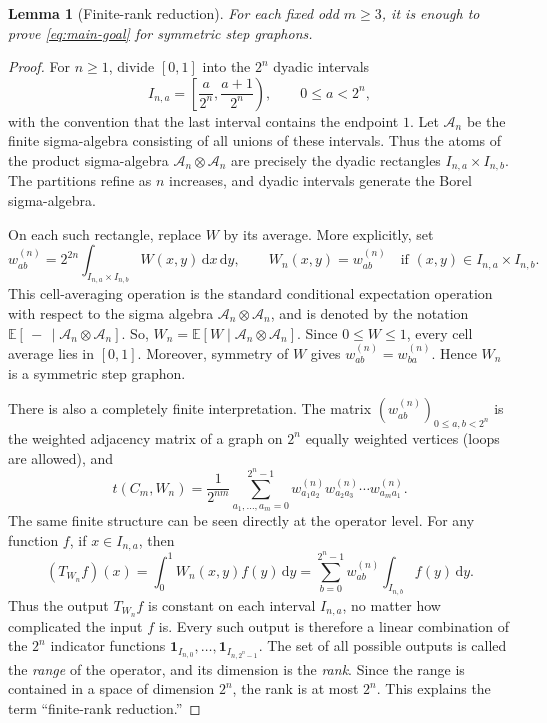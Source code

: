 \documentclass[11pt]{article}
\newtheorem{lemma}[theorem]{Lemma}
\numberwithin{equation}{section}
\newcommand{\one}{\mathbf 1}
\newcommand{\dd}{\,\mathrm d}
\newcommand{\E}{\mathbb E}
\begin{document}
\begin{lemma}[Finite-rank reduction]\label{lem:step-reduction}
  For each fixed odd $m\ge3$, it is enough to prove \eqref{eq:main-goal} for
  symmetric step graphons.
\end{lemma}

\begin{proof}
  For $n\ge1$, divide $[0,1]$ into the $2^n$ dyadic
  intervals
  \[
    I_{n,a}=\left[\frac{a}{2^n},\frac{a+1}{2^n}\right),
    \qquad 0\le a<2^n,
  \]
  with the convention that the last interval contains the endpoint
  $1$.  Let $\mathcal A_n$ be the finite sigma-algebra consisting of all
  unions of these intervals.  Thus the atoms of the product sigma-algebra
  $\mathcal A_n\otimes\mathcal A_n$ are precisely the dyadic rectangles
  $I_{n,a}\times I_{n,b}$.  The partitions refine as $n$ increases, and
  dyadic intervals generate the Borel sigma-algebra.

  On each such rectangle, replace $W$ by its average.  More explicitly, set
  \begin{equation}\label{eq:dyadic-step-approximation}
    w^{(n)}_{ab}
    =2^{2n}\int_{I_{n,a}\times I_{n,b}}W(x,y)\dd x\dd y,
    \qquad
    W_n(x,y)=w^{(n)}_{ab}
    \quad\text{if }(x,y)\in I_{n,a}\times I_{n,b}.
  \end{equation}
  This cell-averaging operation is the standard conditional 
  expectation operation with respect to the sigma algebra
  $\mathcal A_n\otimes\mathcal A_n$, and is 
  denoted by the notation
  $\E[\,-\, \mid\mathcal A_n\otimes\mathcal A_n]$. So,
  $W_n = \E[W\mid\mathcal A_n\otimes\mathcal A_n] $. Since $0\le W\le1$,
  every cell average lies in $[0,1]$.  Moreover, symmetry of $W$ gives
  $w^{(n)}_{ab}=w^{(n)}_{ba}$.  Hence $W_n$ is a symmetric step graphon.

  There is also a completely finite interpretation.  The matrix
  $(w^{(n)}_{ab})_{0\le a,b<2^n}$ is the weighted adjacency matrix of a graph
  on $2^n$ equally weighted vertices (loops are allowed), and
  \[
    t(C_m,W_n)
    =\frac{1}{2^{nm}}
    \sum_{a_1,\ldots,a_m=0}^{2^n-1}
    w^{(n)}_{a_1a_2}w^{(n)}_{a_2a_3}\cdots
    w^{(n)}_{a_ma_1}.
  \]
  The same finite structure can be seen directly at the operator level.  For
  any function $f$, if $x\in I_{n,a}$, then
  \[
    (T_{W_n}f)(x)
    =\int_0^1W_n(x,y)f(y)\dd y
    =\sum_{b=0}^{2^n-1}w^{(n)}_{ab}
    \int_{I_{n,b}}f(y)\dd y.
  \]
  Thus the output $T_{W_n}f$ is constant on each interval $I_{n,a}$, no
  matter how complicated the input $f$ is.  Every such output is therefore a
  linear combination of the $2^n$ indicator functions
  $\one_{I_{n,0}},\ldots,\one_{I_{n,2^n-1}}$.  The set of all possible
  outputs is called the \emph{range} of the operator, and its dimension is the
  \emph{rank}.  Since the range is contained in a space of dimension $2^n$,
  the rank is at most $2^n$.  This explains the term ``finite-rank
  reduction.''


\end{proof}
\end{document}
